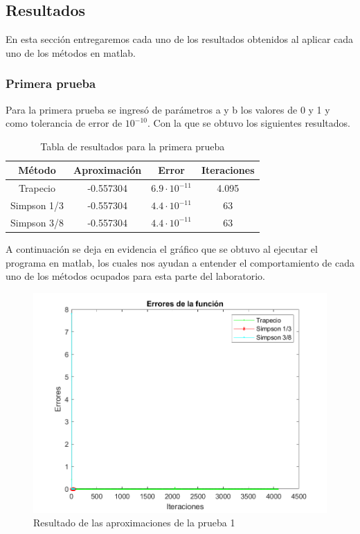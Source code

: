 \subsection{Resultados}

\par En esta sección entregaremos cada uno de los resultados obtenidos al aplicar cada uno de los métodos en matlab.

\subsubsection{Primera prueba}

\par Para la primera prueba se ingresó de parámetros a y b los valores de 0 y 1 y como tolerancia de error de $10^{-10}$. Con la que se obtuvo los siguientes resultados.

\begin{table}[htp]
	\centering
	\begin{tabular}{ |c|c|c|c|}
		\hline
		\textbf{Método} & \textbf{Aproximación} & \textbf{Error} & \textbf{Iteraciones} \\
		\hline
		Trapecio & -0.557304 & $6.9 \cdot 10^{-11}$ & 4.095  \\
		\hline
		Simpson 1/3 & -0.557304 & $4.4 \cdot 10^{-11}$ & 63  \\
		\hline
		Simpson 3/8 & -0.557304 & $4.4 \cdot 10^{-11}$ & 63 \\
		\hline
	\end{tabular}
	\caption{Tabla de resultados para la primera prueba}
	\label{tab:tab3}
\end{table}

\par A continuación se deja en evidencia el gráfico que se obtuvo al ejecutar el programa en matlab, los cuales nos ayudan a entender el comportamiento de cada uno de los métodos ocupados para esta parte del laboratorio.

\begin{figure}[!ht]
	\centering
	\includegraphics[scale=0.7]{Imagenes/erroresFuncion.png}
	\caption{Resultado de las aproximaciones de la prueba 1}
	\label{fig:ej}
\end{figure}


